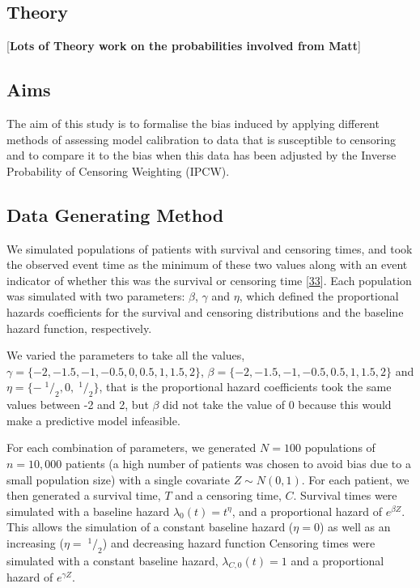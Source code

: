 \documentclass[12pt,PhD,twoside,openright]{muthesis}
\newcommand{\sfrac}[2]{\;^{#1}/_{#2}}
\begin{document}
\hypertarget{theory}{%
\subsection{Theory}\label{theory}}

{[}\textbf{Lots of Theory work on the probabilities involved from Matt}{]}

\hypertarget{aims}{%
\subsection{Aims}\label{aims}}

The aim of this study is to formalise the bias induced by applying different methods of assessing model calibration to data that is susceptible to censoring and to compare it to the bias when this data has been adjusted by the Inverse Probability of Censoring Weighting (IPCW).

\hypertarget{data-generating-method}{%
\subsection{Data Generating Method}\label{data-generating-method}}

We simulated populations of patients with survival and censoring times, and took the observed event time as the minimum of these two values along with an event indicator of whether this was the survival or censoring time {[}\protect\hyperlink{ref-burton_design_2006}{33}{]}. Each population was simulated with two parameters: \(\beta\), \(\gamma\) and \(\eta\), which defined the proportional hazards coefficients for the survival and censoring distributions and the baseline hazard function, respectively.

We varied the parameters to take all the values,\(\gamma = \{-2,-1.5,-1,-0.5,0,0.5,1,1.5,2\}\), \(\beta = \{-2,-1.5,-1,-0.5,0.5,1,1.5,2\}\) and \(\eta = \{-\sfrac{1}{2},0,\sfrac{1}{2}\}\), that is the proportional hazard coefficients took the same values between -2 and 2, but \(\beta\) did not take the value of 0 because this would make a predictive model infeasible.

For each combination of parameters, we generated \(N = 100\) populations of \(n = 10,000\) patients (a high number of patients was chosen to avoid bias due to a small population size) with a single covariate \(Z \sim N(0,1)\). For each patient, we then generated a survival time, \(T\) and a censoring time, \(C\). Survival times were simulated with a baseline hazard \(\lambda_0(t) = t^{\eta}\), and a proportional hazard of \(e^{\beta Z}\). This allows the simulation of a constant baseline hazard (\(\eta = 0\)) as well as an increasing (\(\eta = \sfrac{1}{2}\)) and decreasing hazard function Censoring times were simulated with a constant baseline hazard, \(\lambda_{C,0}(t) = 1\) and a proportional hazard of \(e^{\gamma Z}\).
\end{document}
